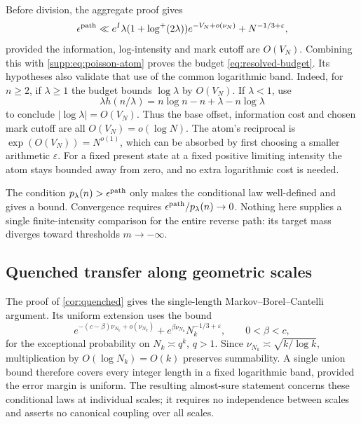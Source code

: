 Before division, the aggregate proof gives
\[
 \epsilon^{\rm path}\ll
 e^I\lambda(1+\log^+(2\lambda))e^{-V_N+o(\nu_N)}
                      +N^{-1/3+\varepsilon},
\]
provided the information, log-intensity and mark cutoff are $O(V_N)$.
Combining this with \eqref{supp:eq:poisson-atom} proves the budget
\eqref{eq:resolved-budget}. Its hypotheses also validate that use of the
common logarithmic band. Indeed, for $n\ge2$, if $\lambda\ge1$ the budget
bounds $\log\lambda$ by $O(V_N)$. If $\lambda<1$, use
\[
 \lambda h(n/\lambda)=n\log n-n+\lambda-n\log\lambda
\]
to conclude $|\log\lambda|=O(V_N)$. Thus the base offset, information
cost and chosen mark cutoff are all $O(V_N)=o(\log N)$.
The atom's reciprocal is $\exp(O(V_N))=N^{o(1)}$, which can be absorbed
by first choosing a smaller arithmetic $\varepsilon$.
For a fixed present state at a fixed positive limiting intensity the
atom stays bounded away from zero, and no extra logarithmic cost is needed.

The condition $p_\lambda(n)>\epsilon^{\rm path}$ only makes the
conditional law well-defined and gives a bound. Convergence requires
$\epsilon^{\rm path}/p_\lambda(n)\to0$. Nothing here supplies a single
finite-intensity comparison for the entire reverse path: its target
mass diverges toward thresholds $m\to-\infty$.

\subsection{Quenched transfer along geometric scales}
The proof of \cref{cor:quenched} gives the single-length
Markov--Borel--Cantelli argument. Its uniform extension uses the bound
\[
 e^{-(c-\beta)\nu_{N_k}+o(\nu_{N_k})}
       +e^{\beta\nu_{N_k}}N_k^{-1/3+\varepsilon},\qquad 0<\beta<c,
\]
for the exceptional probability on $N_k\asymp q^k$, $q>1$.
Since $\nu_{N_k}\asymp\sqrt{k/\log k}$, multiplication by
$O(\log N_k)=O(k)$ preserves summability. A single union bound therefore
covers every integer length in a fixed logarithmic band, provided the
error margin is uniform. The resulting almost-sure statement concerns
these conditional laws at individual scales; it requires no independence
between scales and asserts no canonical coupling over all scales.

